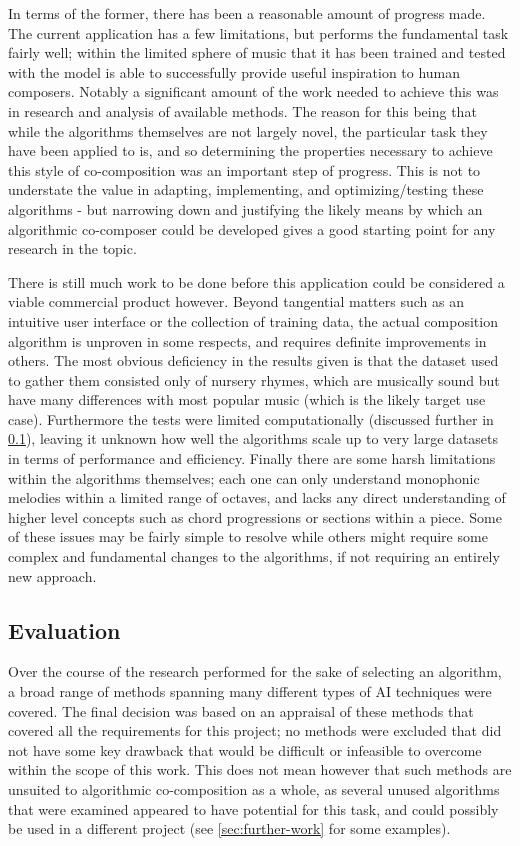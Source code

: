 \documentclass[ author={Stephen Livermore-Tozer},
				supervisor={Dr. Peter Flach},
				degree={MEng},
				title={Algorithmic Co-composition Using Machine Learning},
				subtitle={},
				type={research},
				year={2016} ]{dissertation}
\begin{document}
	In terms of the former, there has been a reasonable amount of progress made. The current application has a few limitations, but performs the fundamental task fairly well; within the limited sphere of music that it has been trained and tested with the model is able to successfully provide useful inspiration to human composers. Notably a significant amount of the work needed to achieve this was in research and analysis of available methods. The reason for this being that while the algorithms themselves are not largely novel, the particular task they have been applied to is, and so determining the properties necessary to achieve this style of co-composition was an important step of progress. This is not to understate the value in adapting, implementing, and optimizing/testing these algorithms - but narrowing down and justifying the likely means by which an algorithmic co-composer could be developed gives a good starting point for any research in the topic.
	
	There is still much work to be done before this application could be considered a viable commercial product however. Beyond tangential matters such as an intuitive user interface or the collection of training data, the actual composition algorithm is unproven in some respects, and requires definite improvements in others. The most obvious deficiency in the results given is that the dataset used to gather them consisted only of nursery rhymes, which are musically sound but have many differences with most popular music (which is the likely target use case). Furthermore the tests were limited computationally (discussed further in \ref{sec:project-evaluation}), leaving it unknown how well the algorithms scale up to very large datasets in terms of performance and efficiency. Finally there are some harsh limitations within the algorithms themselves; each one can only understand monophonic melodies within a limited range of octaves, and lacks any direct understanding of higher level concepts such as chord progressions or sections within a piece. Some of these issues may be fairly simple to resolve while others might require some complex and fundamental changes to the algorithms, if not requiring an entirely new approach.
	
	
	\subsection{Evaluation}
	\label{sec:project-evaluation}
	
	Over the course of the research performed for the sake of selecting an algorithm, a broad range of methods spanning many different types of AI techniques were covered. The final decision was based on an appraisal of these methods that covered all the requirements for this project; no methods were excluded that did not have some key drawback that would be difficult or infeasible to overcome within the scope of this work. This does not mean however that such methods are unsuited to algorithmic co-composition as a whole, as several unused algorithms that were examined appeared to have potential for this task, and could possibly be used in a different project (see \ref{sec:further-work} for some examples).
	
\end{document}
